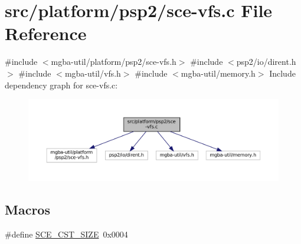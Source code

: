 \hypertarget{sce-vfs_8c}{}\section{src/platform/psp2/sce-\/vfs.c File Reference}
\label{sce-vfs_8c}
{\ttfamily \#include $<$mgba-\/util/platform/psp2/sce-\/vfs.\+h$>$}\newline
{\ttfamily \#include $<$psp2/io/dirent.\+h$>$}\newline
{\ttfamily \#include $<$mgba-\/util/vfs.\+h$>$}\newline
{\ttfamily \#include $<$mgba-\/util/memory.\+h$>$}\newline
Include dependency graph for sce-\/vfs.c\+:
\nopagebreak
\begin{figure}[H]
\begin{center}
\leavevmode
\includegraphics[width=350pt]{sce-vfs_8c__incl}
\end{center}
\end{figure}
\subsection*{Macros}
\begin{DoxyCompactItemize}
\item 
\#define \mbox{\hyperlink{sce-vfs_8c_a8ee878502d4240f77073d169f35ec4ba}{S\+C\+E\+\_\+\+C\+S\+T\+\_\+\+S\+I\+ZE}}~0x0004
\end{DoxyCompactItemize}
